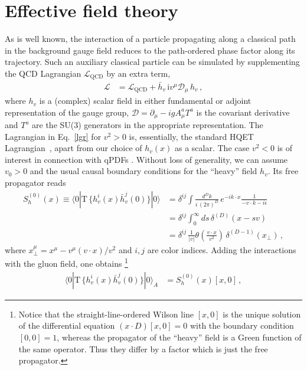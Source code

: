 \documentclass[12pt]{article}
\numberwithin{equation}{section}
\newcommand{\1}[1]{\mathbf{1}^{#1}}
\newcommand{\2}[1]{\mathbf{2}^{#1}}
\newcommand{\3}[1]{\mathbf{3}^{#1}}
\newcommand{\4}[1]{\mathbf{4}^{#1}}
\newcommand{\5}[1]{\mathbf{5}^{#1}}
\newcommand{\mlabel}[1]{ \text{\footnotesize \hspace{3mm}\fbox{\fbox{$#1$}} \label{#1}}}
\renewcommand{\mlabel}[1]{\label{#1}}
\newcommand{\nnb}{\nonumber}
\newcommand{\prd}{\partial}
\newcommand{\vv}{v^2}
\begin{document}
\section{Effective field theory}
\label{sec:two}
As is well known, the interaction of a particle propagating along a classical path in the background gauge field
reduces to the path-ordered phase factor along its trajectory. 
Such an auxiliary classical particle can be simulated by supplementing the QCD Lagrangian $\mathcal{L}_\mathrm{QCD}$
by an extra term,
\begin{align}
\mathcal{L}   &= \mathcal{L}_\mathrm{QCD} +\bar{h}_v\, \mathrm{i} v^{\mu}\mathcal{D}_{\mu} \, h_v\,,
\mlabel{lgr}
\end{align}
where $h_v$ is a (complex) scalar field in either fundamental or adjoint
representation of the gauge group, 
$\mathcal{D} = \prd_{\mu} -i g A^a_{\mu} T^a$ is the covariant derivative
and
$T^a$ are the  SU(3) generators in the appropriate representation. The Lagrangian in Eq.~\eqref{lgr} for
 $\vv >0$ is, essentially, the standard 
 HQET Lagrangian~\cite{Neubert:1993mb}, apart from our choice of $h_v(x)$ as
 a scalar. The case $\vv  < 0$   is of interest in connection with qPDFs
\cite{Ji:2017oey, Zhang:2018diq}.
Without loss of generality, we can assume $v_0>0$ and the usual causal boundary conditions for the
``heavy'' field $h_v$. Its free propagator reads
\begin{align}
  S_h^{(0)}(x) \equiv  \langle 0 |\text{T}\,\{h_v^i(x) \bar h_v^j(0)\} |0\rangle &=
\delta^{ij} \int\frac{ d^Dk}{i\,(2\pi)^D }\, e^{-ik\cdot x} \frac{1}{-v\cdot k-i\epsilon}
\nnb \\
&= 
\delta^{ij}\int_0^\infty \!\! ds \, \delta^{(D)}(x - sv) 
 \nnb \\
&= \delta^{ij}\,\frac{1}{|v|}\theta\left(\frac{v\cdot x}{\vv}\right)\,\delta^{(D-1)}(x_\perp)\,, 
       \mlabel{sprop}
\end{align}
where  $x_\perp^\mu = x^\mu - v^\mu (v \cdot x)/\vv $ and $i,j$ are color indices. 
Adding the interactions with the gluon field, one obtains
\cite{Dorn:1986dt}\footnote{%
Notice that the straight-line-ordered Wilson line $[x,0]$
is the unique solution of the differential equation $(x\cdot D)[x,0]=0$ with the 
boundary condition $[0,0]=1$, whereas the propagator of the ``heavy'' field is a Green function of the same
operator. Thus they differ by a factor which is just the free propagator.}
\begin{align}
  \langle 0 |\text{T}\,\{h_v^i(x) \bar h_v^j(0)\} |0\rangle_A &= S_h^{(0)}(x) [x,0]\,,
\end{align}
\end{document}
